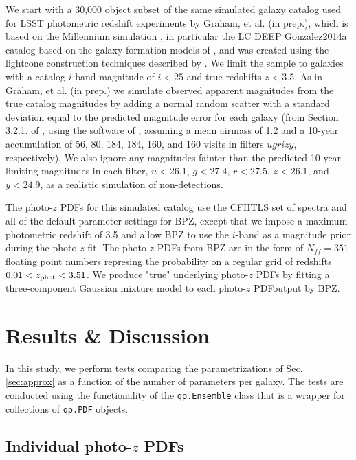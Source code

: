 \documentclass[\docopts]{\docclass}
\newcommand{\pz}{photo-$z$ PDF}
\begin{document}
We start with a 30,000 object subset of the same simulated galaxy catalog used 
for LSST photometric redshift experiments by Graham, et al. (in prep.), which 
is based on the Millennium simulation \citep{springel_simulations_2005}, in 
particular the LC DEEP Gonzalez2014a  catalog 
based on the galaxy formation models of \cite{gonzalez-perez_how_2014}, and was 
created using the lightcone construction techniques described by 
\cite{merson_lightcone_2013}.  We limit the sample to galaxies with a catalog 
$i$-band magnitude of $i<25$ and true redshifts $z<3.5$. As in Graham, et al. 
(in prep.) we simulate observed apparent magnitudes from the true catalog 
magnitudes by adding a normal random scatter with a standard deviation equal to 
the predicted magnitude error for each galaxy (from Section 3.2.1. of 
\citealt{ivezic_lsst:_2008}, using the software of 
\citealt{connolly_end--end_2014}, assuming a mean airmass of 1.2 and a 10-year 
accumulation of 56, 80, 184, 184, 160, and 160 visits in filters $ugrizy$, 
respectively).  We also ignore any magnitudes fainter than the predicted 
10-year limiting magnitudes in each filter, $u<26.1$, $g<27.4$, $r<27.5$, 
$z<26.1$, and $y<24.9$, as a realistic simulation of non-detections.

The \pz s for this simulated catalog use the CFHTLS set of spectra 
\citep{ilbert_accurate_2006} and all of the default parameter settings for BPZ, 
except that we impose a maximum photometric redshift of 3.5 and allow BPZ to 
use the $i$-band as a magnitude prior during the photo-$z$ fit. The \pz s from 
BPZ are in the form of $N_{ff} = 351$ floating point numbers represing the 
probability on a regular grid of redshifts $0.01 < z_{\rm phot} < 3.51$.  We 
produce "true" underlying \pz s by fitting a three-component Gaussian mixture 
model to each \pz output by BPZ.



\section{Results \& Discussion}
\label{sec:results}


In this study, we perform tests comparing the parametrizations of Sec. 
\ref{sec:approx} as a function of the number of parameters per galaxy.  The 
tests are conducted using the functionality of the \texttt{qp.Ensemble} class 
that is a wrapper for collections of \texttt{qp.PDF} objects.

\subsection{Individual \pz s}
\label{sec:individual}
\end{document}

